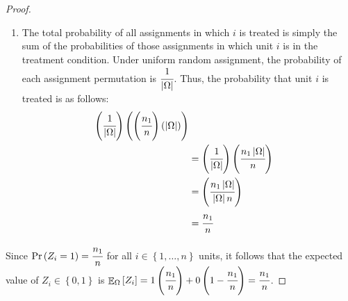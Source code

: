 \documentclass[12pt,leqno]{article}
\theoremstyle{newstyle}
\DeclareMathOperator{\E}{\mathbb{E}}
\begin{document}
\begin{proof}
\begin{enumerate}
\item The total probability of all assignments in which $i$ is treated is simply the sum of the probabilities of those assignments in which unit $i$ is in the treatment condition. Under uniform random assignment, the probability of each assignment permutation is $\cfrac{1}{\left\lvert\Omega\right\rvert}$. Thus, the probability that unit $i$ is treated is as follows:
\begin{align*}
\left(\cfrac{1}{\left\lvert\Omega\right\rvert}\right) \left(\left(\cfrac{n_1}{n}\right)\left(\left\lvert\Omega\right\rvert\right)\right) \\ 
& = \left(\cfrac{1}{\left\lvert\Omega\right\rvert}\right) \left(\cfrac{n_1\left\lvert\Omega\right\rvert}{n}\right) \\
& = \left(\cfrac{n_1\left\lvert\Omega\right\rvert}{\left\lvert\Omega\right\rvert n}\right) \\ 
& = \cfrac{n_1}{n}  
 \end{align*}
\end{enumerate}

Since $\Pr\left(Z_i = 1\right) = \cfrac{n_1}{n}$ for all $i \in \left\{1, \dots , n\right\}$ units, it follows that the expected value of $Z_i \in \left\{0, 1\right\}$ is $\E_{\Omega}\left[Z_i\right] = 1\left(\cfrac{n_1}{n}\right) + 0\left(1 - \cfrac{n_1}{n}\right) = \cfrac{n_1}{n}$.
\end{proof}
\end{document}
